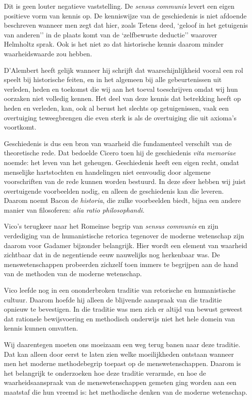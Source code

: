 Dit is geen louter negatieve vaststelling. De \textit{sensus communis} levert een eigen positieve vorm van kennis op. De kenniswijze van de geschiedenis is niet afdoende beschreven wanneer men zegt dat hier, zoals Tetens deed, `geloof in het getuigenis van anderen'' in de plaats komt van de `zelfbewuste deductie'' waarover Helmholtz sprak. Ook is het niet zo dat historische kennis daarom minder waarheidswaarde zou hebben.

D'Alembert heeft gelijk wanneer hij schrijft dat waarschijnlijkheid vooral een rol speelt bij historische feiten, en in het algemeen bij alle gebeurtenissen uit verleden, heden en toekomst die wij aan het toeval toeschrijven omdat wij hun oorzaken niet volledig kennen. Het deel van deze kennis dat betrekking heeft op heden en verleden, kan, ook al berust het slechts op getuigenissen, vaak een overtuiging teweegbrengen die even sterk is als de overtuiging die uit axioma's voortkomt.

Geschiedenis is dus een bron van waarheid die fundamenteel verschilt van de theoretische rede. Dat bedoelde Cicero toen hij de geschiedenis \textit{vita memoriae} noemde: het leven van het geheugen. Geschiedenis heeft een eigen recht, omdat menselijke hartstochten en handelingen niet eenvoudig door algemene voorschriften van de rede kunnen worden bestuurd. In deze sfeer hebben wij juist overtuigende voorbeelden nodig, en alleen de geschiedenis kan die leveren. Daarom noemt Bacon de \textit{historia}, die zulke voorbeelden biedt, bijna een andere manier van filosoferen: \textit{alia ratio philosophandi}.

Vico's terugkeer naar het Romeinse begrip van \textit{sensus communis} en zijn verdediging van de humanistische retorica tegenover de moderne wetenschap zijn daarom voor Gadamer bijzonder belangrijk. Hier wordt een element van waarheid zichtbaar dat in de negentiende eeuw nauwelijks nog herkenbaar was. De menswetenschappen probeerden zichzelf toen immers te begrijpen aan de hand van de methoden van de moderne wetenschap.

Vico leefde nog in een ononderbroken traditie van retorische en humanistische cultuur. Daarom hoefde hij alleen de blijvende aanspraak van die traditie opnieuw te bevestigen. In die traditie was men zich er altijd van bewust geweest dat rationele bewijsvoering en methodisch onderwijs niet het hele domein van kennis kunnen omvatten.

Wij daarentegen moeten ons moeizaam een weg terug banen naar deze traditie. Dat kan alleen door eerst te laten zien welke moeilijkheden ontstaan wanneer men het moderne methodebegrip toepast op de menswetenschappen. Daarom is het belangrijk te onderzoeken hoe deze traditie verarmde, en hoe de waarheidsaanspraak van de menswetenschappen gemeten ging worden aan een maatstaf die hun vreemd is: het methodische denken van de moderne wetenschap.

